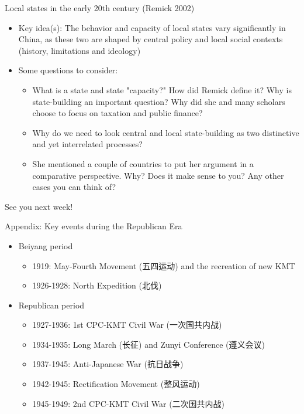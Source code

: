 \documentclass[
  10pt,
  ignorenonframetext,
]{beamer}
\begin{document}
\begin{frame}{Local states in the early 20th century (Remick 2002)}
\label{local-states-in-the-early-20th-century-remick-2002}
\begin{itemize}
  \item Key idea(s): The behavior and capacity of local states vary significantly in China, as these two are shaped by central policy and local social contexts (history, limitations and ideology)
  \vspace{0.3cm}
  \item Some questions to consider:
  \vspace{0.1cm}
  \begin{itemize}
    \item What is a state and state "capacity?" How did Remick define it? Why is state-building an important question? Why did she and many scholars choose to focus on taxation and public finance?
    \item Why do we need to look central and local state-building as two distinctive and yet interrelated processes?
    \item She mentioned a couple of countries to put her argument in a comparative perspective. Why? Does it make sense to you? Any other cases you can think of?
  \end{itemize}
\end{itemize}
\end{frame}

\begin{frame}
\vspace{1cm}

See you next week!
\end{frame}

\begin{frame}{Appendix: Key events during the Republican Era}
\label{appendix-key-events-during-the-republican-era}
\begin{itemize}
  \item Beiyang period
  \vspace{0.1cm}
  \begin{itemize}
    \item 1919: May-Fourth Movement (五四运动) and the recreation of new KMT
    \item 1926-1928: North Expedition (北伐)
  \end{itemize}
  \vspace{0.3cm}
  \item Republican period
  \begin{itemize}
    \item 1927-1936: 1st CPC-KMT Civil War (一次国共内战)
    \item 1934-1935: Long March (长征) and Zunyi Conference (遵义会议)
    \item 1937-1945: Anti-Japanese War (抗日战争)
    \item 1942-1945: Rectification Movement (整风运动)
    \item 1945-1949: 2nd CPC-KMT Civil War (二次国共内战)
  \end{itemize}
\end{itemize}
\end{frame}
\end{document}
